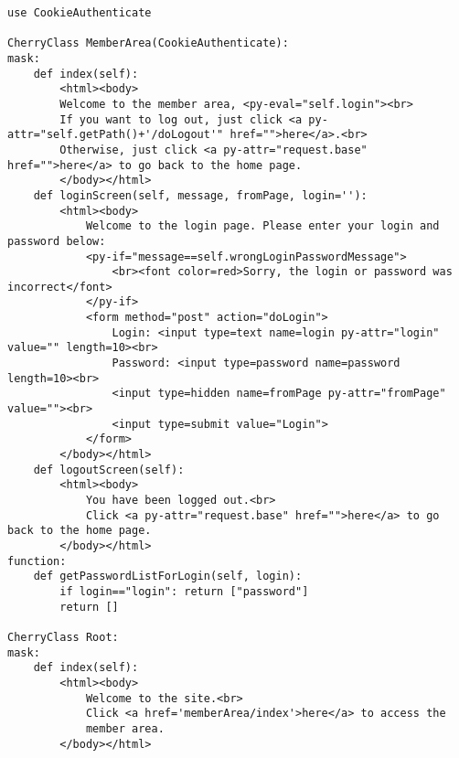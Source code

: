 \begin{verbatim}
use CookieAuthenticate

CherryClass MemberArea(CookieAuthenticate):
mask:
    def index(self):
        <html><body>
        Welcome to the member area, <py-eval="self.login"><br>
        If you want to log out, just click <a py-attr="self.getPath()+'/doLogout'" href="">here</a>.<br>
        Otherwise, just click <a py-attr="request.base" href="">here</a> to go back to the home page.
        </body></html>
    def loginScreen(self, message, fromPage, login=''):
        <html><body>
            Welcome to the login page. Please enter your login and password below:
            <py-if="message==self.wrongLoginPasswordMessage">
                <br><font color=red>Sorry, the login or password was incorrect</font>
            </py-if>
            <form method="post" action="doLogin">
                Login: <input type=text name=login py-attr="login" value="" length=10><br>
                Password: <input type=password name=password length=10><br>
                <input type=hidden name=fromPage py-attr="fromPage" value=""><br>
                <input type=submit value="Login">
            </form>
        </body></html>
    def logoutScreen(self):
        <html><body>
            You have been logged out.<br>
            Click <a py-attr="request.base" href="">here</a> to go back to the home page.
        </body></html>
function:
    def getPasswordListForLogin(self, login):
        if login=="login": return ["password"]
        return []

CherryClass Root:
mask:
    def index(self):
        <html><body>
            Welcome to the site.<br>
            Click <a href='memberArea/index'>here</a> to access the
            member area.
        </body></html>
\end{verbatim}


